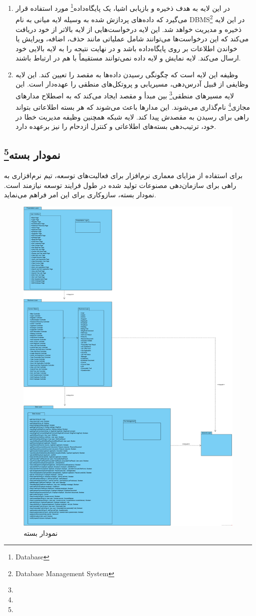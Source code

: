\documentclass[12pt]{article}
\begin{document}
\begin{enumerate}
		\item {}
		در این لایه به هدف ذخیره و بازیابی اشیا، یک پایگاه‌داده\footnote{Database} مورد استفاده قرار می‌گیرد که داده‌های پردازش شده به وسيله لایه میانی به نام DBMS\footnote{Database Management System} در این لایه ذخیره و مدیریت خواهد شد. این لایه درخواست‌هایی از لایه بالاتر از خود دریافت می‌کند که این درخواست‌ها می‌توانند شامل عملیاتی مانند حذف، اضافه، ویرایش یا خواندن اطلاعات بر روی پایگاه‌داده باشد و در نهایت نتیجه را به لایه بالایی خود ارسال می‌کند. لایه نمایش و لایه داده نمی‌توانند مستقیماً با هم در ارتباط باشند.

		\item {}
		وظیفه این لایه است که چگونگی رسیدن داده‌ها به مقصد را تعیین کند. این لایه وظایفی از قبیل آدرس‌دهی، مسیریابی و پروتکل‌های منطقی را عهده‌دار است. این لایه مسیرهای منطقی\footnote{} بین مبدأ و مقصد ایجاد می‌کند که به اصطلاح مدارهای مجازی\footnote{} نام‌گذاری می‌شوند. این مدارها باعث می‌شوند که هر بسته اطلاعاتی بتواند راهی برای رسیدن به مقصدش پیدا کند. لایه شبکه همچنین وظیفه مدیریت خطا در خود، ترتیب‌دهی بسته‌های اطلاعاتی و کنترل ازدحام را نیز برعهده دارد.

	\end{enumerate}

	\subsection{نمودار بسته\footnote{}}
	برای استفاده از مزایای معماری نرم‌افزار برای فعالیت‌های توسعه، تیم نرم‌افزاری به راهی برای سازمان‌دهی مصنوعات تولید شده در طول فرایند توسعه نیازمند است. نمودار بسته، سازوکاری برای این امر فراهم می‌نماید.
	\begin{figure}[H]
		\centering
		\includegraphics[width=0.5\linewidth]{files/Project_OOAD_Phase2_PackageDiagram}
		\caption{نمودار بسته}
		\label{fig:packagediagram}
	\end{figure}
\end{document}
